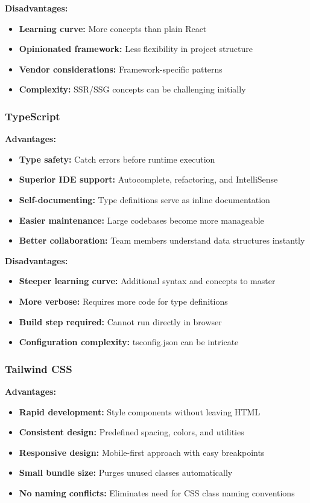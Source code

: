\textbf{Disadvantages:}
\begin{itemize}
    \item \textbf{Learning curve:} More concepts than plain React
    \item \textbf{Opinionated framework:} Less flexibility in project structure
    \item \textbf{Vendor considerations:} Framework-specific patterns
    \item \textbf{Complexity:} SSR/SSG concepts can be challenging initially
\end{itemize}

\subsubsection{TypeScript}

\textbf{Advantages:}
\begin{itemize}
    \item \textbf{Type safety:} Catch errors before runtime execution
    \item \textbf{Superior IDE support:} Autocomplete, refactoring, and IntelliSense
    \item \textbf{Self-documenting:} Type definitions serve as inline documentation
    \item \textbf{Easier maintenance:} Large codebases become more manageable
    \item \textbf{Better collaboration:} Team members understand data structures instantly
\end{itemize}

\textbf{Disadvantages:}
\begin{itemize}
    \item \textbf{Steeper learning curve:} Additional syntax and concepts to master
    \item \textbf{More verbose:} Requires more code for type definitions
    \item \textbf{Build step required:} Cannot run directly in browser
    \item \textbf{Configuration complexity:} tsconfig.json can be intricate
\end{itemize}

\subsubsection{Tailwind CSS}

\textbf{Advantages:}
\begin{itemize}
    \item \textbf{Rapid development:} Style components without leaving HTML
    \item \textbf{Consistent design:} Predefined spacing, colors, and utilities
    \item \textbf{Responsive design:} Mobile-first approach with easy breakpoints
    \item \textbf{Small bundle size:} Purges unused classes automatically
    \item \textbf{No naming conflicts:} Eliminates need for CSS class naming conventions
\end{itemize}


